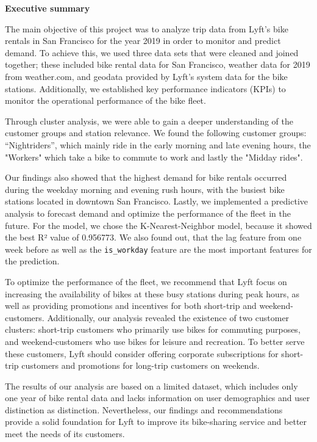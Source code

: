\hypertarget{abstract}{}

\thispagestyle{plain}

\begin{center}
    \LARGE{\textbf{Executive summary}}
\end{center}

The main objective of this project was to analyze trip data from Lyft's bike rentals in San Francisco for the year 2019 in order to monitor and predict demand. To achieve this, we used three data sets that were cleaned and joined together; these included bike rental data for San Francisco, weather data for 2019 from weather.com, and geodata provided by Lyft's system data for the bike stations. Additionally, we established key performance indicators (KPIs) to monitor the operational performance of the bike fleet.

Through cluster analysis, we were able to gain a deeper understanding of the customer groups and station relevance. We found the following customer groups: \enquote{Nightriders}, which mainly ride in the early morning and late evening hours,  the "Workers" which take a bike to commute to work and lastly the "Midday rides". 

Our findings also showed that the highest demand for bike rentals occurred during the weekday morning and evening rush hours, with the busiest bike stations located in downtown San Francisco. 
Lastly, we implemented a predictive analysis to forecast demand and optimize the performance of the fleet in the future. For the model, we chose the K-Nearest-Neighbor model, because it showed the best R² value of 0.956773. We also found out, that the lag feature from one week before as well as the \texttt{is\_workday} feature are the most important features for the prediction.

To optimize the performance of the fleet, we recommend that Lyft focus on increasing the availability of bikes at these busy stations during peak hours, as well as providing promotions and incentives for both short-trip and weekend-customers. Additionally, our analysis revealed the existence of two customer clusters: short-trip customers who primarily use bikes for commuting purposes, and weekend-customers who use bikes for leisure and recreation. To better serve these customers, Lyft should consider offering corporate subscriptions for short-trip customers and promotions for long-trip customers on weekends.

The results of our analysis are based on a limited dataset, which includes only one year of bike rental data and lacks information on user demographics and user distinction as distinction. Nevertheless, our findings and recommendations provide a solid foundation for Lyft to improve its bike-sharing service and better meet the needs of its customers.
